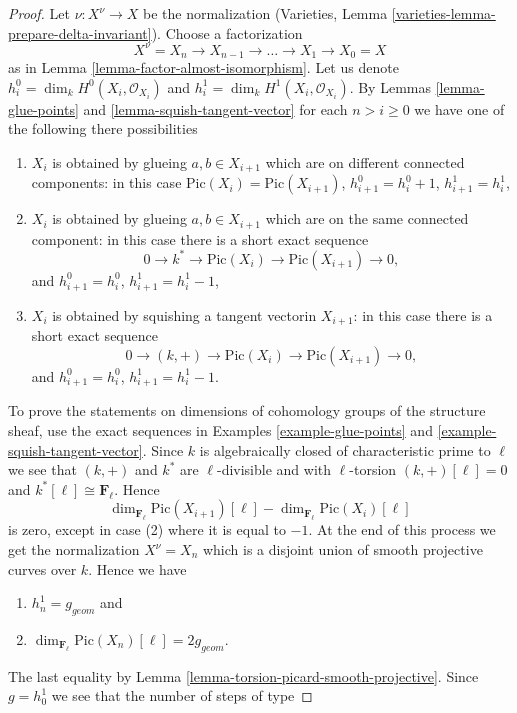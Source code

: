 \begin{proof}
Let $\nu : X^\nu \to X$ be the normalization
(Varieties, Lemma \ref{varieties-lemma-prepare-delta-invariant}).
Choose a factorization
$$
X^\nu = X_n \to X_{n - 1} \to \ldots \to X_1 \to X_0 = X
$$
as in Lemma \ref{lemma-factor-almost-isomorphism}.
Let us denote $h^0_i = \dim_k H^0(X_i, \mathcal{O}_{X_i})$
and $h^1_i = \dim_k H^1(X_i, \mathcal{O}_{X_i})$.
By Lemmas \ref{lemma-glue-points} and \ref{lemma-squish-tangent-vector}
for each $n > i \geq 0$ we have
one of the following there possibilities
\begin{enumerate}
\item $X_i$ is obtained by glueing $a, b \in X_{i + 1}$
which are on different connected components: in this case
$\text{Pic}(X_i) = \text{Pic}(X_{i + 1})$,
$h^0_{i + 1} = h^0_i + 1$, $h^1_{i + 1} = h^1_i$,
\item $X_i$ is obtained by glueing $a, b \in X_{i + 1}$
which are on the same connected component: in this case
there is a short exact sequence
$$
0 \to k^* \to \text{Pic}(X_i) \to \text{Pic}(X_{i + 1}) \to 0,
$$
and $h^0_{i + 1} = h^0_i$, $h^1_{i + 1} = h^1_i - 1$,
\item $X_i$ is obtained by squishing a tangent vectorin $X_{i + 1}$:
in this case there is a short exact sequence
$$
0 \to (k, +) \to \text{Pic}(X_i) \to \text{Pic}(X_{i + 1}) \to 0,
$$
and $h^0_{i + 1} = h^0_i$, $h^1_{i + 1} = h^1_i - 1$.
\end{enumerate}
To prove the statements on dimensions of cohomology groups of the
structure sheaf, use the exact sequences in
Examples \ref{example-glue-points} and \ref{example-squish-tangent-vector}.
Since $k$ is algebraically closed of characteristic prime to $\ell$
we see that $(k, +)$ and $k^*$ are $\ell$-divisible and with
$\ell$-torsion $(k, +)[\ell] = 0$ and $k^*[\ell] \cong \mathbf{F}_\ell$.
Hence
$$
\dim_{\mathbf{F}_\ell} \text{Pic}(X_{i + 1})[\ell] -
\dim_{\mathbf{F}_\ell}\text{Pic}(X_i)[\ell]
$$
is zero, except in case (2) where it is equal to $-1$.
At the end of this process we get the normalization
$X^\nu = X_n$ which is a disjoint union of smooth projective
curves over $k$. Hence we have
\begin{enumerate}
\item $h^1_n = g_{geom}$ and
\item $\dim_{\mathbf{F}_\ell} \text{Pic}(X_n)[\ell] = 2g_{geom}$.
\end{enumerate}
The last equality by Lemma \ref{lemma-torsion-picard-smooth-projective}.
Since $g = h^1_0$ we see that the number of steps of type

\end{proof}
